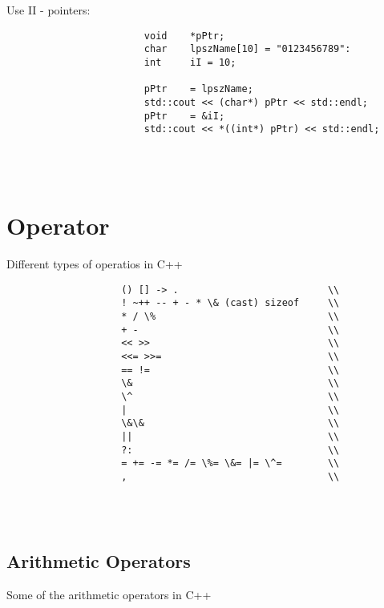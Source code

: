\documentclass{report}
\begin{document}
				\begin{minipage}{\linewidth}
					Use II - pointers:
					\begin{lstlisting}
						void 	*pPtr;
						char	lpszName[10] = "0123456789":
						int 	iI = 10;
						
						pPtr	= lpszName;
						std::cout << (char*) pPtr << std::endl;
						pPtr	= &iI;
						std::cout << *((int*) pPtr) << std::endl;
					\end{lstlisting}
				\end{minipage}
				\\ \\
		
		
		
		\section{Operator}
			Different types of operatios in C++ \\
			
			\begin{minipage}{\linewidth}
				\begin{lstlisting}
					() [] -> .							\\
					! ~++ -- + - * \& (cast) sizeof		\\
					* / \%								\\
					+ -									\\
					<< >>								\\
					<<= >>=								\\
					== !=								\\
					\&									\\
					\^									\\
					|									\\
					\&\&								\\
					||									\\
					?:									\\
					= += -= *= /= \%= \&= |= \^=		\\
					,									\\
				\end{lstlisting}
			\end{minipage}
			\\ \\
			
			
			\subsection{Arithmetic Operators}
				Some of the arithmetic operators in C++ \\
				
\end{document}
